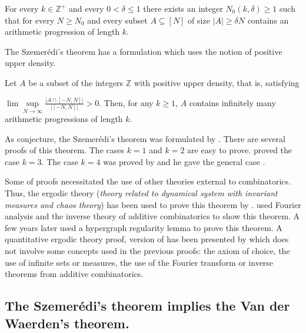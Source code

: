 \begin{thm}	For every  $k \in \mathbb{Z}^+$ and every $0< \delta \leq  1$ there exists an integer $N_0(k,\delta) \geq 1$ such that for every $N \geq N_0$ and every subset $A \subseteq [N]$ of size $|A|\geq \delta N$ contains an arithmetic progression of length $k.$  \label{sz1} \end{thm}

The Szemerédi's theorem has a formulation which uses the notion of positive upper density. 

Let $A$ be a subset of the integers $\mathbb{Z}$ with positive upper  density, that is, satisfying 

$\lim \sup\limits_{N\rightarrow \infty} \frac{|A \cap[-N,N]|}{|[-N,N]|} > 0.$
Then, for any $k \geq  1 $, $A$ contains infinitely many arithmetic progressions of length $k.$

As conjecture, the Szemerédi's theorem was formulated by \cite{JLMS}. There are several proofs of this theorem. The cases $k=1$ and $k=2$ are easy to prove. \cite{roth1953certain, roth1970irregularities} proved the case $k=3.$ The case $k=4$ was proved by \cite{szemeredi1969sets} and he gave the general case \citep{szemeredi1975sets}.

Some of proofs necessitated the use of other theories external to combinatorics. Thus, the ergodic theory (\textit{theory related to dynamical system with invariant measures and chaos theory})  has been used to prove this theorem by \cite*{furstenberg1977ergodic, furstenberg1982ergodic}.
\cite{gowers1998fourier, gowers2001new}  used Fourier analysis and the inverse theory of additive  combinatorics to show this theorem. A few years later \cite{gowers2007hypergraph} used a hypergraph regularity lemma to prove this theorem. A  quantitative ergodic theory proof, version of \cite{furstenberg1982ergodic} has been presented  by \cite{tao2006quantitative} which does not involve some concepts used in the previous proofs: the axiom of choice, the use of infinite sets or measures, the use of the Fourier transform or inverse theorems from additive combinatorics.

\subsection{The Szemerédi's theorem implies the Van der Waerden's theorem.} \label{vsz}

